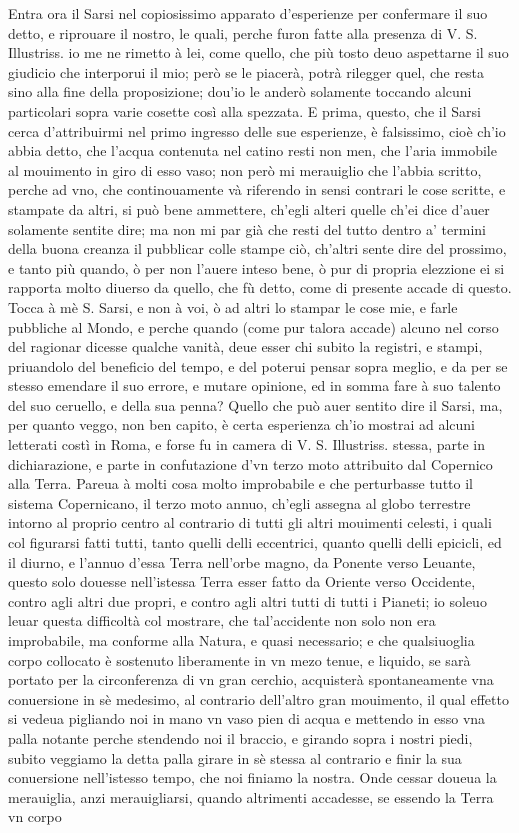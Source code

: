 \documentclass[11pt,twoside,openany]{book}
\begin{document}
Entra ora il Sarsi nel copiosissimo apparato d'esperienze per confermare il suo detto, e riprouare il nostro, le quali, perche furon fatte alla presenza di V. S. Illustriss. io me ne rimetto à lei, come quello, che più tosto deuo aspettarne il suo giudicio che interporui il mio; però se le piacerà, potrà rilegger quel, che resta sino alla fine della proposizione; dou'io le anderò solamente toccando alcuni particolari sopra varie cosette così alla spezzata. E prima, questo, che il Sarsi cerca d'attribuirmi nel primo ingresso delle sue esperienze, è falsissimo, cioè ch'io abbia detto, che l'acqua contenuta nel catino resti non men, che l'aria immobile al mouimento in giro di esso vaso; non però mi merauiglio che l'abbia scritto, perche ad vno, che continouamente và riferendo in sensi contrari le cose scritte, e stampate da altri, si può bene ammettere, ch'egli alteri quelle ch'ei dice d'auer solamente sentite dire; ma non mi par già che resti del tutto dentro a' termini della buona creanza il pubblicar colle stampe ciò, ch'altri sente dire del prossimo, e tanto più quando, ò per non l'auere inteso bene, ò pur di propria elezzione ei si rapporta molto diuerso da quello, che fù detto, come di presente accade di questo. Tocca à mè S. Sarsi, e non à voi, ò ad altri lo stampar le cose mie, e farle pubbliche al Mondo, e perche quando (come pur talora accade) alcuno nel corso del ragionar dicesse qualche vanità, deue esser chi subito la registri, e stampi, priuandolo del beneficio del tempo, e del poterui pensar sopra meglio, e da per se stesso emendare il suo errore, e mutare opinione, ed in somma fare à suo talento del suo ceruello, e della sua penna? Quello che può auer sentito dire il Sarsi, ma, per quanto veggo, non ben capito, è certa esperienza ch'io mostrai ad alcuni letterati costì in Roma, e forse fu in camera di V. S. Illustriss. stessa, parte in dichiarazione, e parte in confutazione d'vn terzo moto attribuito dal Copernico alla Terra. Pareua à molti cosa molto improbabile e che perturbasse tutto il sistema Copernicano, il terzo moto annuo, ch'egli assegna al globo terrestre intorno al proprio centro al contrario di tutti gli altri mouimenti celesti, i quali col figurarsi fatti tutti, tanto quelli delli eccentrici, quanto quelli delli epicicli, ed il diurno, e l'annuo d'essa Terra nell'orbe magno, da Ponente verso Leuante, questo solo douesse nell'istessa Terra esser fatto da Oriente verso Occidente, contro agli altri due propri, e contro agli altri tutti di tutti i Pianeti; io soleuo leuar questa difficoltà col mostrare, che tal'accidente non solo non era improbabile, ma conforme alla Natura, e quasi necessario; e che qualsiuoglia corpo collocato è sostenuto liberamente in vn mezo tenue, e liquido, se sarà portato per la circonferenza di vn gran cerchio, acquisterà spontaneamente vna conuersione in sè medesimo, al contrario dell'altro gran mouimento, il qual effetto si vedeua pigliando noi in mano vn vaso pien di acqua e mettendo in esso vna palla notante perche stendendo noi il braccio, e girando sopra i nostri piedi, subito veggiamo la detta palla girare in sè stessa al contrario e finir la sua conuersione nell'istesso tempo, che noi finiamo la nostra. Onde cessar doueua la merauiglia, anzi merauigliarsi, quando altrimenti accadesse, se essendo la Terra vn corpo 
\end{document}
